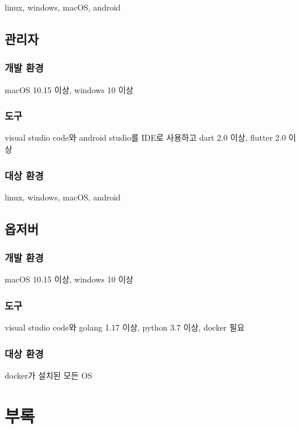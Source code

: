 \documentclass[11pt,a4paper,left=15mm,right=15mm,top=20mm,bottom=20mm]{article}
\begin{document}
            linux, windows, macOS, android

    \subsection{관리자}

        \subsubsection{개발 환경}

            macOS 10.15 이상, windows 10 이상

        \subsubsection{도구}

            visual studio code와 android studio를 IDE로 사용하고 dart 2.0 이상, flutter 2.0 이상

        \subsubsection{대상 환경}

            linux, windows, macOS, android

    \subsection{옵저버}

        \subsubsection{개발 환경}

            macOS 10.15 이상, windows 10 이상

        \subsubsection{도구}

            visual studio code와 golang 1.17 이상, python 3.7 이상, docker 필요

        \subsubsection{대상 환경}

            docker가 설치된 모든 OS

\section{부록}
\end{document}
